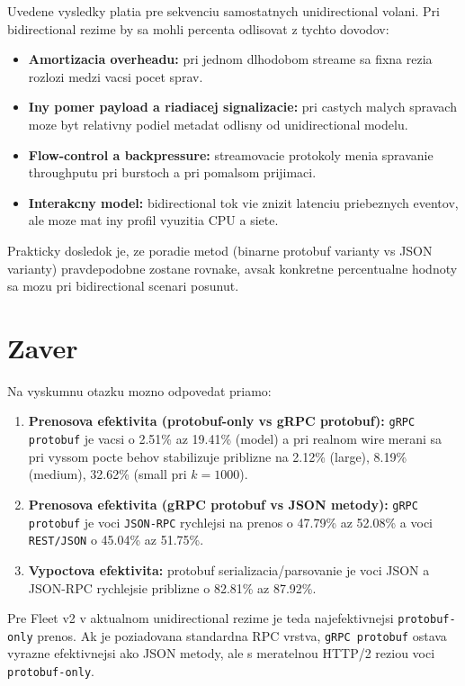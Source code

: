\documentclass[12pt,a4paper]{report}
\begin{document}
Uvedene vysledky platia pre sekvenciu samostatnych unidirectional volani.
Pri bidirectional rezime by sa mohli percenta odlisovat z tychto dovodov:
\begin{itemize}
  \item \textbf{Amortizacia overheadu:} pri jednom dlhodobom streame sa
  fixna rezia rozlozi medzi vacsi pocet sprav.
  \item \textbf{Iny pomer payload a riadiacej signalizacie:} pri castych
  malych spravach moze byt relativny podiel metadat odlisny od unidirectional modelu.
  \item \textbf{Flow-control a backpressure:} streamovacie protokoly menia
  spravanie throughputu pri burstoch a pri pomalsom prijimaci.
  \item \textbf{Interakcny model:} bidirectional tok vie znizit latenciu
  priebeznych eventov, ale moze mat iny profil vyuzitia CPU a siete.
\end{itemize}

Prakticky dosledok je, ze poradie metod
(binarne protobuf varianty vs JSON varianty) pravdepodobne zostane rovnake,
avsak konkretne percentualne hodnoty sa mozu pri bidirectional scenari posunut.

\section{Zaver}

Na vyskumnu otazku mozno odpovedat priamo:
\begin{enumerate}
  \item \textbf{Prenosova efektivita (protobuf-only vs gRPC protobuf):}
  \texttt{gRPC protobuf} je vacsi o 2.51\% az 19.41\% (model)
  a pri realnom wire merani sa pri vyssom pocte behov stabilizuje
  priblizne na 2.12\% (large), 8.19\% (medium), 32.62\% (small pri $k=1000$).
  \item \textbf{Prenosova efektivita (gRPC protobuf vs JSON metody):}
  \texttt{gRPC protobuf} je voci \texttt{JSON-RPC} rychlejsi na prenos
  o 47.79\% az 52.08\% a voci \texttt{REST/JSON} o 45.04\% az 51.75\%.
  \item \textbf{Vypoctova efektivita:}
  protobuf serializacia/parsovanie je voci JSON a JSON-RPC
  rychlejsie priblizne o 82.81\% az 87.92\%.
\end{enumerate}

Pre Fleet v2 v aktualnom unidirectional rezime je teda najefektivnejsi
\texttt{protobuf-only} prenos. Ak je poziadovana standardna RPC vrstva,
\texttt{gRPC protobuf} ostava vyrazne efektivnejsi ako JSON metody,
ale s meratelnou HTTP/2 reziou voci \texttt{protobuf-only}.
\end{document}
